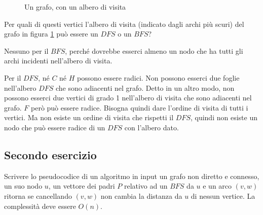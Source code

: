 \begin{figure}
\centering
{}
\caption{\label{fig:primo_esercizio_esonero}Un grafo, con un albero di visita}
\end{figure}

Per quali di questi vertici l'albero di visita (indicato dagli archi pi\`u scuri) del grafo in figura \ref{fig:primo_esercizio_esonero} pu\`o essere un $DFS$ o un $BFS$?

Nessuno per il $BFS$, perch\'e dovrebbe esserci almeno un nodo che ha tutti gli archi incidenti nell'albero di visita.

Per il $DFS$, n\'e $C$ n\'e $H$ possono essere radici. Non possono esserci due foglie nell'albero $DFS$ che sono adiacenti nel grafo. Detto in un altro modo, non possono esserci due vertici di grado 1 nell'albero di visita che sono adiacenti nel grafo. $F$ per\`o pu\`o essere radice. Bisogna quindi dare l'ordine di visita di tutti i vertici. Ma non esiste un ordine di visita che rispetti il $DFS$, quindi non esiste un nodo che pu\`o essere radice di un $DFS$ con l'albero dato.

\clearpage

\subsection{Secondo esercizio}

Scrivere lo pseudocodice di un algoritmo in input un grafo non diretto e connesso, un suo nodo $u$, un vettore dei padri $P$ relativo ad un $BFS$ da $u$ e un arco $(v,w)$ ritorna  se cancellando $(v,w)$ non cambia la distanza da $u$ di nessun vertice. La complessit\`a deve essere $O(n)$.

